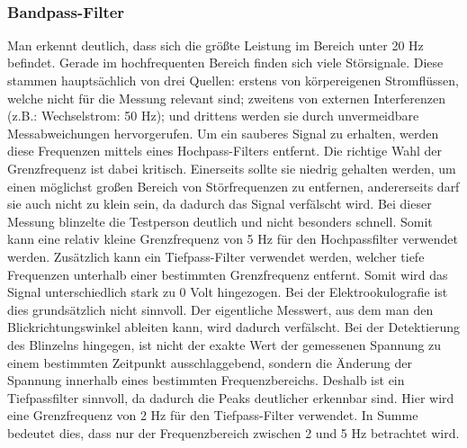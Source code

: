 \documentclass[11pt]{article}
\begin{document}
    \begin{center}
    \end{center}
    { \hspace*{\fill} \\}
    
    \subsubsection{Bandpass-Filter}\label{bandpass-filter}

Man erkennt deutlich, dass sich die größte Leistung im Bereich unter 20
Hz befindet. Gerade im hochfrequenten Bereich finden sich viele
Störsignale. Diese stammen hauptsächlich von drei Quellen: erstens von
körpereigenen Stromflüssen, welche nicht für die Messung relevant sind;
zweitens von externen Interferenzen (z.B.: Wechselstrom: 50 Hz); und
drittens werden sie durch unvermeidbare Messabweichungen hervorgerufen.
Um ein sauberes Signal zu erhalten, werden diese Frequenzen mittels
eines Hochpass-Filters entfernt. Die richtige Wahl der Grenzfrequenz ist
dabei kritisch. Einerseits sollte sie niedrig gehalten werden, um einen
möglichst großen Bereich von Störfrequenzen zu entfernen, andererseits
darf sie auch nicht zu klein sein, da dadurch das Signal verfälscht
wird. Bei dieser Messung blinzelte die Testperson deutlich und nicht
besonders schnell. Somit kann eine relativ kleine Grenzfrequenz von 5 Hz
für den Hochpassfilter verwendet werden. Zusätzlich kann ein
Tiefpass-Filter verwendet werden, welcher tiefe Frequenzen unterhalb
einer bestimmten Grenzfrequenz entfernt. Somit wird das Signal
unterschiedlich stark zu 0 Volt hingezogen. Bei der Elektrookulografie
ist dies grundsätzlich nicht sinnvoll. Der eigentliche Messwert, aus dem
man den Blickrichtungswinkel ableiten kann, wird dadurch verfälscht. Bei
der Detektierung des Blinzelns hingegen, ist nicht der exakte Wert der
gemessenen Spannung zu einem bestimmten Zeitpunkt ausschlaggebend,
sondern die Änderung der Spannung innerhalb eines bestimmten
Frequenzbereichs. Deshalb ist ein Tiefpassfilter sinnvoll, da dadurch
die Peaks deutlicher erkennbar sind. Hier wird eine Grenzfrequenz von 2
Hz für den Tiefpass-Filter verwendet. In Summe bedeutet dies, dass nur
der Frequenzbereich zwischen 2 und 5 Hz betrachtet wird.
\end{document}
